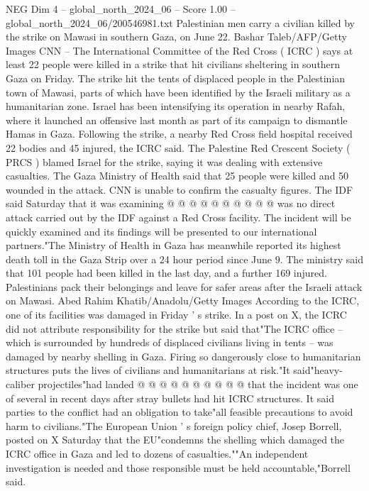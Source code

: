 \begin{textsample}{NEG Dim 4 – global\_north\_2024\_06 – Score 1.00 – global\_north\_2024\_06/200546981.txt}  \label{ex:f4_neg_315}
Palestinian men carry a civilian killed by the strike on Mawasi in southern Gaza, on June 22.
Bashar Taleb/AFP/Getty Images CNN -- The International Committee of the Red Cross ( ICRC ) says at least 22 people were killed in a strike that hit civilians sheltering in southern Gaza on Friday.
The strike hit the tents of displaced people in the Palestinian town of Mawasi, parts of which have been identified by the Israeli military as a humanitarian zone.
Israel has been intensifying its operation in nearby Rafah, where it launched an offensive last month as part of its campaign to dismantle Hamas in Gaza.
Following the strike, a nearby Red Cross field hospital received 22 bodies and 45 injured, the ICRC said.
The Palestine Red Crescent Society ( PRCS ) blamed Israel for the strike, saying it was dealing with extensive casualties.
The Gaza Ministry of Health said that 25 people were killed and 50 wounded in the attack.
CNN is unable to confirm the casualty figures.
The IDF said Saturday that it was examining @ @ @ @ @ @ @ @ @ @ was no direct attack carried out by the IDF against a Red Cross facility.
The incident will be quickly examined and its findings will be presented to our international partners."The Ministry of Health in Gaza has meanwhile reported its highest death toll in the Gaza Strip over a 24 hour period since June 9.
The ministry said that 101 people had been killed in the last day, and a further 169 injured.
Palestinians pack their belongings and leave for safer areas after the Israeli attack on Mawasi.
Abed Rahim Khatib/Anadolu/Getty Images According to the ICRC, one of its facilities was damaged in Friday ' s strike.
In a post on X, the ICRC did not attribute responsibility for the strike but said that"The ICRC office -- which is surrounded by hundreds of displaced civilians living in tents -- was damaged by nearby shelling in Gaza.
Firing so dangerously close to humanitarian structures puts the lives of civilians and humanitarians at risk."It said"heavy-caliber projectiles"had landed @ @ @ @ @ @ @ @ @ @ that the incident was one of several in recent days after stray bullets had hit ICRC structures.
It said parties to the conflict had an obligation to take"all feasible precautions to avoid harm to civilians."The European Union ' s foreign policy chief, Josep Borrell, posted on X Saturday that the EU"condemns the shelling which damaged the ICRC office in Gaza and led to dozens of casualties.""An independent investigation is needed and those responsible must be held accountable,"Borrell said.

\end{textsample}
